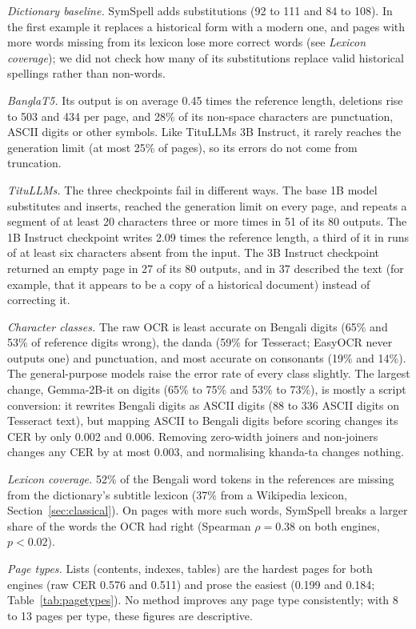\documentclass[conference]{IEEEtran}
\begin{document}
\emph{Dictionary baseline.} SymSpell adds substitutions (92 to 111 and 84 to 108). In the first example it replaces a historical form with a modern one, and pages with more words missing from its lexicon lose more correct words (see \emph{Lexicon coverage}); we did not check how many of its substitutions replace valid historical spellings rather than non-words.

\emph{BanglaT5.} Its output is on average 0.45 times the reference length, deletions rise to 503 and 434 per page, and 28\% of its non-space characters are punctuation, ASCII digits or other symbols. Like TituLLMs 3B Instruct, it rarely reaches the generation limit (at most 25\% of pages), so its errors do not come from truncation.

\emph{TituLLMs.} The three checkpoints fail in different ways. The base 1B model substitutes and inserts, reached the generation limit on every page, and repeats a segment of at least 20 characters three or more times in 51 of its 80 outputs. The 1B Instruct checkpoint writes 2.09 times the reference length, a third of it in runs of at least six characters absent from the input. The 3B Instruct checkpoint returned an empty page in 27 of its 80 outputs, and in 37 described the text (for example, that it appears to be a copy of a historical document) instead of correcting it.

\emph{Character classes.} The raw OCR is least accurate on Bengali digits (65\% and 53\% of reference digits wrong), the danda (59\% for Tesseract; EasyOCR never outputs one) and punctuation, and most accurate on consonants (19\% and 14\%). The general-purpose models raise the error rate of every class slightly. The largest change, Gemma-2B-it on digits (65\% to 75\% and 53\% to 73\%), is mostly a script conversion: it rewrites Bengali digits as ASCII digits (88 to 336 ASCII digits on Tesseract text), but mapping ASCII to Bengali digits before scoring changes its CER by only 0.002 and 0.006. Removing zero-width joiners and non-joiners changes any CER by at most 0.003, and normalising khanda-ta changes nothing.

\emph{Lexicon coverage.} 52\% of the Bengali word tokens in the references are missing from the dictionary's subtitle lexicon (37\% from a Wikipedia lexicon, Section~\ref{sec:classical}). On pages with more such words, SymSpell breaks a larger share of the words the OCR had right (Spearman $\rho=0.38$ on both engines, $p<0.02$).

\emph{Page types.} Lists (contents, indexes, tables) are the hardest pages for both engines (raw CER 0.576 and 0.511) and prose the easiest (0.199 and 0.184; Table~\ref{tab:pagetypes}). No method improves any page type consistently; with 8 to 13 pages per type, these figures are descriptive.
\end{document}
